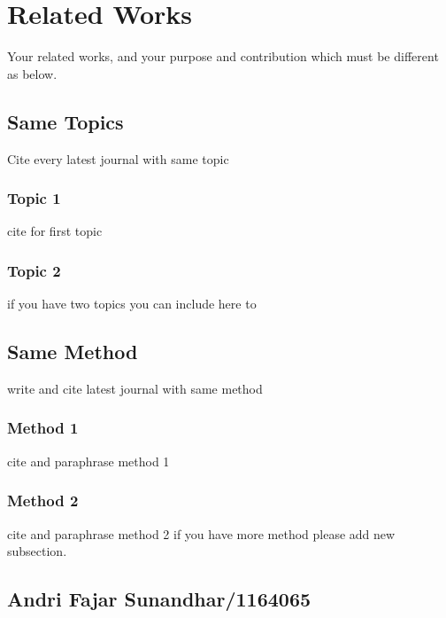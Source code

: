 \chapter{Related Works}

Your related works, and your purpose and contribution which must be different as below.

\section{Same Topics}
Cite every latest journal with same topic
\subsection{Topic 1}
cite for first topic

\subsection{Topic 2}
if you have two topics you can include here to


\section{Same Method}
write and cite latest journal with same method

\subsection{Method 1}
cite and paraphrase method 1

\subsection{Method 2}
cite and paraphrase method 2 if you have more method please add new subsection.




 \section{Andri Fajar Sunandhar/1164065}
